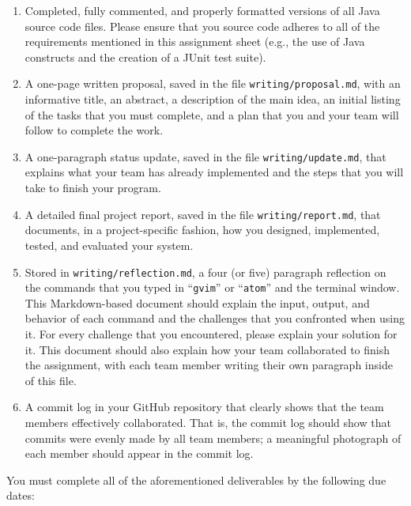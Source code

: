 \documentclass[11pt]{article}
\newcommand{\reflection}{\lstinline{writing/reflection.md}}
\newcommand{\command}[1]{``\lstinline{#1}''}
\newcommand{\program}[1]{\lstinline{#1}}
\begin{document}
\begin{enumerate}

  \setlength{\itemsep}{0in}

\item Completed, fully commented, and properly formatted versions of all Java
  source code files. Please ensure that you source code adheres to all of the
  requirements mentioned in this assignment sheet (e.g., the use of Java
  constructs and the creation of a JUnit test suite).

\item A one-page written proposal, saved in the file
  \program{writing/proposal.md}, with an informative title, an abstract, a
  description of the main idea, an initial listing of the tasks that you must
  complete, and a plan that you and your team will follow to complete the
  work.

\item A one-paragraph status update, saved in the file
  \program{writing/update.md}, that explains what your team has already
  implemented and the steps that you will take to finish your program.

\item A detailed final project report, saved in the file
  \program{writing/report.md}, that documents, in a project-specific fashion,
  how you designed, implemented, tested, and evaluated your system.

\item Stored in \reflection{}, a four (or five) paragraph reflection on the
  commands that you typed in \command{gvim} or \command{atom} and the terminal
  window. This Markdown-based document should explain the input, output, and
  behavior of each command and the challenges that you confronted when using it.
  For every challenge that you encountered, please explain your solution for it.
  This document should also explain how your team collaborated to finish the
  assignment, with each team member writing their own paragraph inside of this
  file.

\item A commit log in your GitHub repository that clearly shows that the team
  members effectively collaborated. That is, the commit log should show that
  commits were evenly made by all team members; a meaningful photograph of each
  member should appear in the commit log.

\end{enumerate}

\noindent
You must complete all of the aforementioned deliverables by the following due dates:
\end{document}
